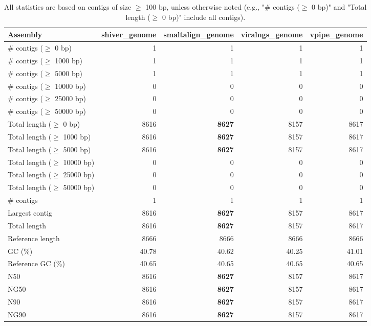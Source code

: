 \documentclass[12pt,a4paper]{article}
\begin{document}
\begin{table}[ht]
\begin{center}
\caption{All statistics are based on contigs of size $\geq$ 100 bp, unless otherwise noted (e.g., "\# contigs ($\geq$ 0 bp)" and "Total length ($\geq$ 0 bp)" include all contigs).}
\begin{tabular}{|l*{4}{|r}|}
\hline
Assembly & shiver\_genome & smaltalign\_genome & viralngs\_genome & vpipe\_genome \\ \hline
\# contigs ($\geq$ 0 bp) & 1 & 1 & 1 & 1 \\ \hline
\# contigs ($\geq$ 1000 bp) & 1 & 1 & 1 & 1 \\ \hline
\# contigs ($\geq$ 5000 bp) & 1 & 1 & 1 & 1 \\ \hline
\# contigs ($\geq$ 10000 bp) & 0 & 0 & 0 & 0 \\ \hline
\# contigs ($\geq$ 25000 bp) & 0 & 0 & 0 & 0 \\ \hline
\# contigs ($\geq$ 50000 bp) & 0 & 0 & 0 & 0 \\ \hline
Total length ($\geq$ 0 bp) & 8616 & {\bf 8627} & 8157 & 8617 \\ \hline
Total length ($\geq$ 1000 bp) & 8616 & {\bf 8627} & 8157 & 8617 \\ \hline
Total length ($\geq$ 5000 bp) & 8616 & {\bf 8627} & 8157 & 8617 \\ \hline
Total length ($\geq$ 10000 bp) & 0 & 0 & 0 & 0 \\ \hline
Total length ($\geq$ 25000 bp) & 0 & 0 & 0 & 0 \\ \hline
Total length ($\geq$ 50000 bp) & 0 & 0 & 0 & 0 \\ \hline
\# contigs & 1 & 1 & 1 & 1 \\ \hline
Largest contig & 8616 & {\bf 8627} & 8157 & 8617 \\ \hline
Total length & 8616 & {\bf 8627} & 8157 & 8617 \\ \hline
Reference length & 8666 & 8666 & 8666 & 8666 \\ \hline
GC (\%) & 40.78 & 40.62 & 40.25 & 41.01 \\ \hline
Reference GC (\%) & 40.65 & 40.65 & 40.65 & 40.65 \\ \hline
N50 & 8616 & {\bf 8627} & 8157 & 8617 \\ \hline
NG50 & 8616 & {\bf 8627} & 8157 & 8617 \\ \hline
N90 & 8616 & {\bf 8627} & 8157 & 8617 \\ \hline
NG90 & 8616 & {\bf 8627} & 8157 & 8617 \\ \hline

\end{tabular}
\end{center}
\end{table}
\end{document}

